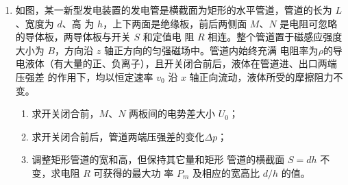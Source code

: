 \begin{enumerate}
\item 
{}
如图，某一新型发电装置的发电管是横截面为矩形的水平管道，管道的长为 $ L $、宽度为 $ d $、高
为 $ h $，上下两面是绝缘板，前后两侧面 $ M $、$ N $ 是电阻可忽略的导体板，两导体板与开关 $ S $ 和定值电
阻 $ R $ 相连。整个管道置于磁感应强度大小为 $ B $，方向沿 $ z $ 轴正方向的匀强磁场中。管道内始终充满
电阻率为$ \rho $的导电液体（有大量的正、负离子），且开关闭合前后，液体在管道进、出口两端压强差
的作用下，均以恒定速率 $ v_{0} $ 沿 $ x $ 轴正向流动，液体所受的摩擦阻力不变。
\begin{enumerate}
	\item
求开关闭合前，$ M $、$ N $ 两板间的电势差大小 $ U_{0} $；


\item 
求开关闭合前后，管道两端压强差的变化$ \Delta p $；

\item 
调整矩形管道的宽和高，但保持其它量和矩形
管道的横截面 $ S=dh $ 不变，求电阻 $ R $ 可获得的最大功
率 $ P_{m} $ 及相应的宽高比 $ d/h $ 的值。

	
\end{enumerate}
\begin{figure}[h!]
	\flushright
	
\end{figure}





\end{enumerate}

